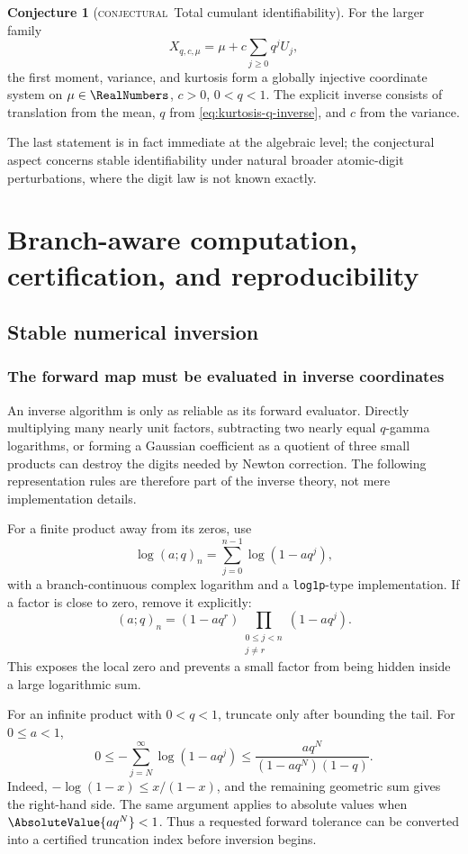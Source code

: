\documentclass[11pt,letterpaper,oneside,openany]{book}
\theoremstyle{definition}
\newtheorem{conjecture}[theorem]{Conjecture}
\theoremstyle{remark}
\newcommand{\statusconjectural}{\textcolor{conjectureorange}{\textsc{conjectural}}}
\begin{document}
\begin{conjecture}[\statusconjectural\ Total cumulant identifiability]
For the larger family
\[
 X_{q,c,\mu}=\mu+c\sum_{j\ge0}q^jU_j,
\]
the first moment, variance, and kurtosis form a globally injective coordinate
system on \(\mu\in\RealNumbers\), \(c>0\), \(0<q<1\).  The explicit inverse consists of
translation from the mean, \(q\) from \eqref{eq:kurtosis-q-inverse}, and
\(c\) from the variance.
\end{conjecture}
The last statement is in fact immediate at the algebraic level; the
conjectural aspect concerns stable identifiability under natural broader
atomic-digit perturbations, where the digit law is not known exactly.

\part{Branch-aware computation, certification, and reproducibility}

\chapter{Stable numerical inversion}

\section{The forward map must be evaluated in inverse coordinates}
An inverse algorithm is only as reliable as its forward evaluator.  Directly
multiplying many nearly unit factors, subtracting two nearly equal
\(q\)-gamma logarithms, or forming a Gaussian coefficient as a quotient of
three small products can destroy the digits needed by Newton correction.  The
following representation rules are therefore part of the inverse theory, not
mere implementation details.

For a finite product away from its zeros, use
\begin{equation}\label{eq:stable-finite-log}
 \log(a;q)_n=\sum_{j=0}^{n-1}\log(1-aq^j),
\end{equation}
with a branch-continuous complex logarithm and a \texttt{log1p}-type
implementation.  If a factor is close to zero, remove it explicitly:
\[
 (a;q)_n=(1-aq^r)\prod_{\substack{0\le j<n\\j\ne r}}(1-aq^j).
\]
This exposes the local zero and prevents a small factor from being hidden
inside a large logarithmic sum.

For an infinite product with \(0<q<1\), truncate only after bounding the tail.
For \(0\le a<1\),
\begin{equation}\label{eq:qpoch-tail-bound}
 0\le-\sum_{j=N}^{\infty}\log(1-aq^j)
 \le \frac{a q^N}{(1-aq^N)(1-q)}.
\end{equation}
Indeed, \(-\log(1-x)\le x/(1-x)\), and the remaining geometric sum gives the
right-hand side.  The same argument applies to absolute values when
\(\AbsoluteValue{a q^N}<1\).  Thus a requested forward tolerance can be converted into a
certified truncation index before inversion begins.
\end{document}
